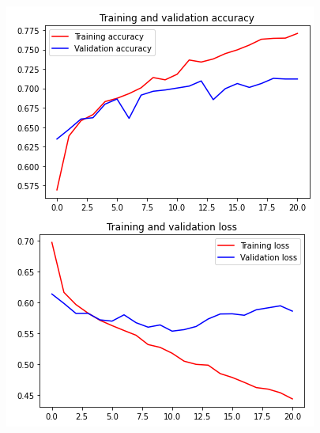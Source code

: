 \documentclass[11pt,a4paper,oneside]{article}
\begin{document}
\begin{figure}[h]
\begin{minipage}[c]{.4\textwidth}
		\includegraphics[width=.9\textwidth]{images/Task 3/VGG19 3.2/Accuracy}
	\end{minipage}
	

\end{figure}
\end{document}
